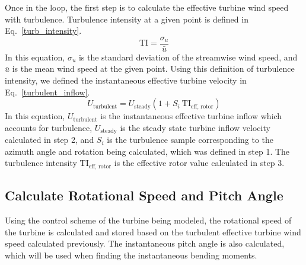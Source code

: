 \documentclass[11pt,letterpaper]{article}
\begin{document}
Once in the loop, the first step is to calculate the effective turbine wind speed with turbulence. Turbulence intensity at a given point is defined in Eq.~\ref{turb_intensity}.
%
\begin{equation}
    \label{turb_intensity}
    \text{TI} = \frac{\sigma_u}{\bar{u}}
\end{equation}
% 
In this equation, $\sigma_u$ is the standard deviation of the streamwise wind speed, and $\bar{u}$ is the mean wind speed at the given point. Using this definition of turbulence intensity, we defined the instantaneous effective turbine velocity in Eq.~\ref{turbulent_inflow}.
%
\begin{equation}
    \label{turbulent_inflow}
    U_{\text{turbulent}} = U_{\text{steady}}(1 + S_i ~\text{TI}_{\text{eff, rotor}})
\end{equation}
% 
In this equation, $U_{\text{turbulent}}$ is the instantaneous effective turbine inflow which accounts for turbulence, $U_{\text{steady}}$ is the steady state turbine inflow velocity calculated in step 2, and $S_i$ is the turbulence sample corresponding to the azimuth angle and rotation being calculated, which was defined in step 1. The turbulence intensity $\text{TI}_{\text{eff, rotor}}$ is the effective rotor value calculated in step 3. 

\subsection{Calculate Rotational Speed and Pitch Angle}
Using the control scheme of the turbine being modeled, the rotational speed of the turbine is calculated and stored based on the turbulent effective turbine wind speed calculated previously. The instantaneous pitch angle is also calculated, which will be used when finding the instantaneous bending moments.
\end{document}
